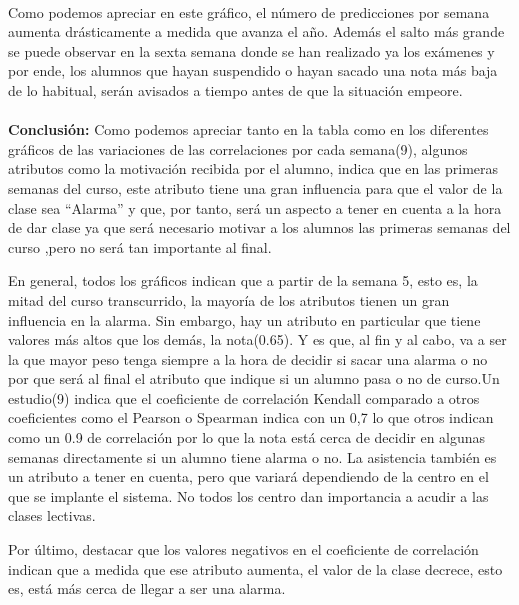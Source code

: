 \paragraph{}
  Como podemos apreciar en este gráfico, el número de
predicciones por semana aumenta drásticamente a medida que avanza el
año. Además el salto más grande se puede observar en la sexta semana
donde se han realizado ya los exámenes y por ende, los alumnos que
hayan suspendido o hayan sacado una nota más baja de lo habitual,
serán avisados a tiempo antes de que la situación empeore.

\paragraph{}
\textbf{Conclusión:} Como podemos apreciar tanto en la tabla como en
los diferentes gráficos de las variaciones de las correlaciones por
cada semana(9), algunos atributos como la motivación recibida por el
alumno, indica que en las primeras semanas del curso, este atributo
tiene una gran influencia para que el valor de la clase sea “Alarma” y
que, por tanto, será un aspecto a tener en cuenta a la hora de dar
clase ya que será necesario motivar a los alumnos las primeras semanas
del curso ,pero no será tan importante al final.

En general, todos los gráficos indican que a partir de la semana 5,
esto es, la mitad del curso transcurrido, la mayoría de los atributos
tienen un gran influencia en la alarma. Sin embargo, hay un atributo
en particular que tiene valores más altos que los demás, la
nota(0.65). Y es que, al fin y al cabo, va a ser la que mayor peso
tenga siempre a la hora de decidir si sacar una alarma o no por que
será al final el atributo que indique si un alumno pasa o no de
curso.Un estudio(9) indica que el coeficiente de correlación Kendall
comparado a otros coeficientes como el Pearson o Spearman indica con
un 0,7 lo que otros indican como un 0.9 de correlación por lo que la
nota está cerca de decidir en algunas semanas directamente si un
alumno tiene alarma o no.  La asistencia también es un atributo a
tener en cuenta, pero que variará dependiendo de la centro en el que
se implante el sistema. No todos los centro dan importancia a acudir a
las clases lectivas.

Por último, destacar que los valores negativos en el coeficiente de
correlación indican que a medida que ese atributo aumenta, el valor de
la clase decrece, esto es, está más cerca de llegar a ser una alarma.


